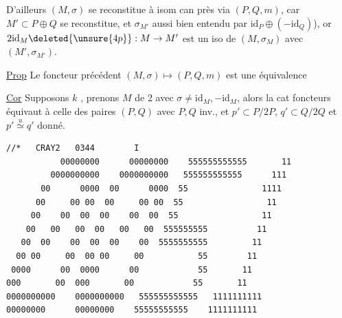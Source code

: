 D'ailleurs  $(M,\sigma)$ se reconstitue à isom can près via $(P,Q,m)$, car $M'\subset P\oplus Q$ se reconstitue, et $\sigma_{M'}$ aussi bien entendu par $\mathrm{id}_P\oplus(-\mathrm{id}_Q)$), or $2\mathrm{id}_M\deleted{\unsure{4p}}:M\to M'$ est un iso de $(M,\sigma_M)$ avec $(M',\sigma_{M'})$.

\uline{Prop} Le foncteur précédent $(M,\sigma)\longmapsto(P,Q,m)$ est une équivalence

\uline{Cor} Supposons $k$   , prenons  $M$   de  2 avec $\sigma\ne\mathrm{id}_M,-\mathrm{id}_M$, alors la cat  foncteurs  équivaut à celle des paires $(P,Q)$ avec $P,Q$ inv., et $p'\subset P/2P$, $q'\subset Q/2Q$ et $p'\overset u\simeq q'$ donné.


{\scriptsize
\begin{verbatim}
//*   CRAY2   0344        I
           00000000      00000000    555555555555       11
         0000000000    0000000000   555555555555      111
       00      0000  00      0000  55               1111
      00     00 00  00     00 00  55                 11
     00    00  00  00    00  00  55                 11
    00   00   00  00   00   00  555555555          11
   00  00    00  00  00    00  5555555555         11
  00 00     00  00 00     00           55        11
 0000      00  0000      00            55       11
000       00  000       00            55       11
0000000000    0000000000   555555555555   1111111111
00000000      00000000    55555555555    1111111111
\end{verbatim}
}


\handwritten{\[
\begin{aligned}\sigma(x,y)&=x-y\\(1+\sigma)(x,y)&=2x\\(1\deleted{\unsure{+}}-\sigma)(x,y)&=2y\end{aligned}
\]}

\handwritten{\[
\begin{aligned}
&\deleted{\unsure{1+2|1+}}\\
&\deleted{\unsure{\forall x\in P,\ \exists\,2y\in M'\!Q|\forall x\in P,\ \exists\,y\in M'|\exists\,x,y\in M'},\ (1+\sigma)(x,y)=x\quad\text{i.e. }2x}\\
&P=\quad\deleted{x\in\ (x,y)\in M'}\\
&\deleted{(x,y)}\,x+2y\in M'
\end{aligned}
\]}

